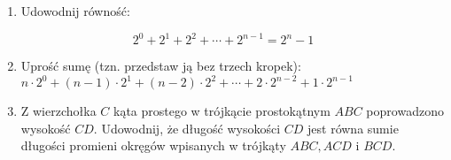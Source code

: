 \documentclass[10pt]{article}
\begin{document}
\begin{enumerate}
  \item Udowodnij równość:
\end{enumerate}

\[
2^{0}+2^{1}+2^{2}+\cdots+2^{n-1}=2^{n}-1
\]

\begin{enumerate}
  \setcounter{enumi}{1}
  \item Uprość sumę (tzn. przedstaw ją bez trzech kropek):\\
\(n \cdot 2^{0}+(n-1) \cdot 2^{1}+(n-2) \cdot 2^{2}+\cdots+2 \cdot 2^{n-2}+1 \cdot 2^{n-1}\)
  \item Z wierzchołka \(C\) kąta prostego w trójkącie prostokątnym \(A B C\) poprowadzono wysokość \(C D\). Udowodnij, że długość wysokości \(C D\) jest równa sumie długości promieni okręgów wpisanych w trójkąty \(A B C, A C D\) i \(B C D\).
\end{enumerate}
\end{document}
